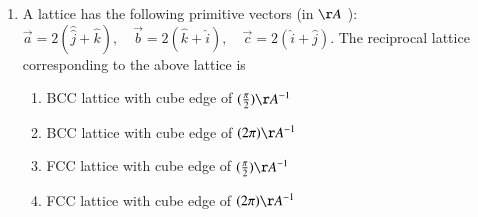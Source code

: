 \documentclass[journal]{IEEEtran}
\begin{document}
\begin{enumerate}
\begin{multicols}{4}
			\begin{enumerate}
   \item $1.87 {~N} / {m}$
\item $18.7 {~N} / {m}$
\item $187 {~N} / {m}$
\item $1870 {~N} / {m}$
\end{enumerate}
		\end{multicols}
  \item   A lattice has the following primitive vectors (in $\AA$ ): $\vec{a}=2(\hat{\hat j}+\hat{k}), \quad \vec{b}=2(\hat{k}+\hat{i}), \quad \vec{c}=2(\hat{i}+\hat{j})$. The reciprocal lattice corresponding to the above lattice is
 
			\begin{enumerate}
   \item BCC lattice with cube edge of $(\frac{\pi}{2}) \AA^{-1}$
\item BCC lattice with cube edge of $(2 \pi) \AA^{-1}$
\item FCC lattice with cube edge of $(\frac{\pi}{2}) \AA^{-1}$
\item FCC lattice with cube edge of $(2 \pi) \AA^{-1}$
  \end{enumerate}
		
 \end{enumerate}
\end{document}
